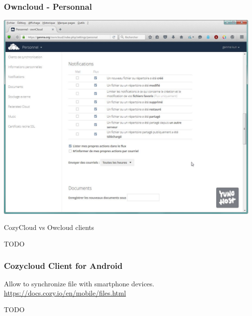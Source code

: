 \documentclass{beamer}
\begin{document}
\begin{frame}
\frametitle{Owncloud - Personnal}
\includegraphics[scale=0.4] {./Owncloud/Owncloud_Personnel.jpg}
\end{frame}


\begin{frame}

\Huge{\centerline{CozyCloud vs Owcloud clients}}
\Huge{\centerline{TODO}}
\end{frame}
\begin{frame}
\frametitle{Cozycloud Client for Android}
\begin{justifying}
Allow to synchronize file with smartphone devices.
\url{https://docs.cozy.io/en/mobile/files.html}
\end{justifying}
\end{frame}
\begin{frame}

\Huge{\centerline{TODO}}
\end{frame}
\end{document}
